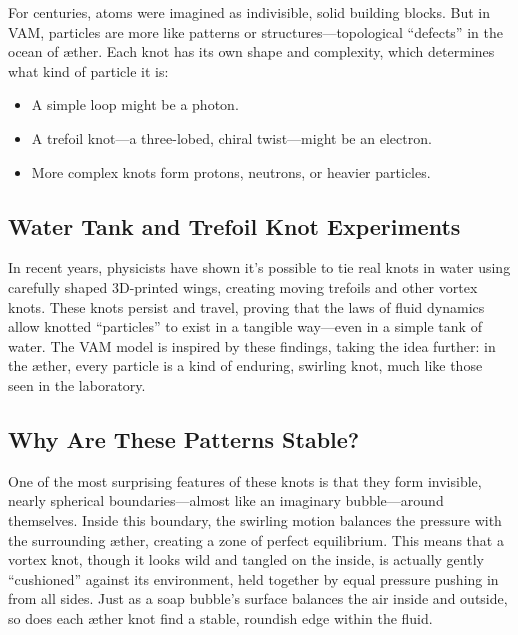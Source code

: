 For centuries, atoms were imagined as indivisible, solid building blocks. But in VAM, particles are more like patterns or structures—topological “defects” in the ocean of æther. Each knot has its own shape and complexity, which determines what kind of particle it is:


\begin{itemize}

\item
A simple loop might be a photon.




\item
A trefoil knot—a three-lobed, chiral twist—might be an electron.




\item
More complex knots form protons, neutrons, or heavier particles.




\end{itemize}

\subsection*{Water Tank and Trefoil Knot Experiments}

In recent years, physicists have shown it’s possible to tie real knots in water using carefully shaped 3D-printed wings, creating moving trefoils and other vortex knots. These knots persist and travel, proving that the laws of fluid dynamics allow knotted “particles” to exist in a tangible way—even in a simple tank of water. The VAM model is inspired by these findings, taking the idea further: in the æther, every particle is a kind of enduring, swirling knot, much like those seen in the laboratory.


\subsection*{Why Are These Patterns Stable?}

One of the most surprising features of these knots is that they form invisible, nearly spherical boundaries—almost like an imaginary bubble—around themselves. Inside this boundary, the swirling motion balances the pressure with the surrounding æther, creating a zone of perfect equilibrium. This means that a vortex knot, though it looks wild and tangled on the inside, is actually gently “cushioned” against its environment, held together by equal pressure pushing in from all sides. Just as a soap bubble’s surface balances the air inside and outside, so does each æther knot find a stable, roundish edge within the fluid.

